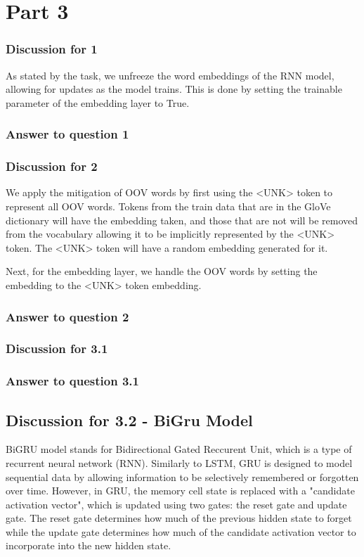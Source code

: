 \documentclass{article}
\begin{document}
\section*{Part 3}

\subsubsection*{Discussion for 1}

As stated by the task, we unfreeze the word embeddings of the RNN model, allowing
for updates as the model trains. This is done by setting the trainable parameter
of the embedding layer to True.

\subsubsection*{Answer to question 1}


\subsubsection*{Discussion for 2}

We apply the mitigation of OOV words by first using the <UNK> token to represent
all OOV words. Tokens from the train data that are in the GloVe dictionary will
have the embedding taken, and those that are not will be removed from the vocabulary
allowing it to be implicitly represented by the <UNK> token. The <UNK> token 
will have a random embedding generated for it.

Next, for the embedding layer, we handle the OOV words by setting the embedding
to the <UNK> token embedding.

\subsubsection*{Answer to question 2}

\subsubsection*{Discussion for 3.1}

\subsubsection*{Answer to question 3.1}

\subsection*{Discussion for 3.2 - BiGru Model}
BiGRU model stands for Bidirectional Gated Reccurent Unit, which is a type of recurrent neural network (RNN). Similarly to LSTM, GRU is designed to model sequential data by allowing information to be selectively remembered or forgotten over time. However, in GRU, the memory cell state is replaced with a "candidate activation vector", which is updated using two gates: the reset gate and update gate. The reset gate determines how much of the previous hidden state to forget while the update gate determines how much of the candidate activation vector to incorporate into the new hidden state. 
\end{document}
